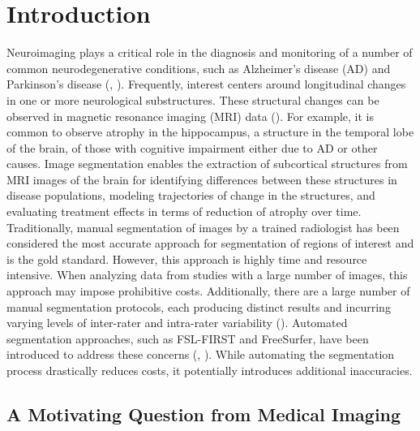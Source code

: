 \documentclass[11pt,reqno]{article}
\theoremstyle{definition}
\begin{document}
\section{Introduction}

Neuroimaging plays a critical role in the diagnosis and monitoring of a number of common neurodegenerative conditions, such as Alzheimer's disease (AD) and Parkinson's disease (\cite{knopmanAlzheimerDisease2021}, \cite{poeweParkinsonDisease2017}). Frequently, interest centers around longitudinal changes in one or more neurological substructures. These structural changes can be observed in magnetic resonance imaging (MRI) data (\cite{crainiceanu2016tutorial}). For example, it is common to observe atrophy in the hippocampus, a structure in the temporal lobe of the brain, of those with  cognitive impairment either due to AD or other causes. Image segmentation enables the extraction of subcortical structures from MRI images of the brain for identifying differences between these structures in disease populations, modeling trajectories of change in the structures, and evaluating treatment effects in terms of reduction of atrophy over time. Traditionally, manual segmentation of images by a trained radiologist has been considered the most accurate approach for segmentation of regions of interest and is the gold standard. However, this approach is highly time and resource intensive. When analyzing data from studies with a large number of images, this approach may impose prohibitive costs. Additionally, there are a large number of manual segmentation protocols, each producing distinct results and incurring varying levels of inter-rater and intra-rater variability (\cite{boccardiSurveyProtocolsManual2011}). Automated segmentation approaches, such as FSL-FIRST and FreeSurfer, have been introduced to address these concerns (\cite{patenaudeBayesianModelShape2011}, \cite{reuterWithinsubjectTemplateEstimation2012}). While automating the segmentation process drastically reduces costs, it potentially introduces additional inaccuracies.


\subsection{A Motivating Question from Medical Imaging}
\end{document}
